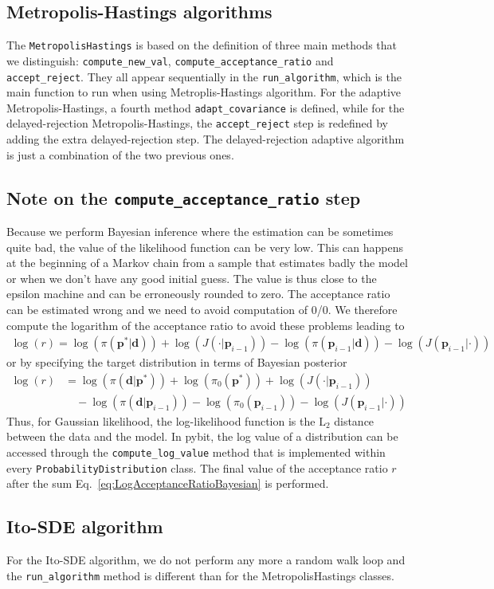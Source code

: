 \documentclass[a4paper,11pt]{article}
\begin{document}
\subsection{Metropolis-Hastings algorithms}

The \texttt{MetropolisHastings} is based on the definition of three main methods that we distinguish: \texttt{compute\_new\_val},  \texttt{compute\_acceptance\_ratio} and \texttt{accept\_reject}. They all appear sequentially in the \texttt{run\_algorithm}, which is the main function to run when using Metroplis-Hastings algorithm. For the adaptive Metropolis-Hastings, a fourth method \texttt{adapt\_covariance} is defined, while for the delayed-rejection Metropolis-Hastings, the \texttt{accept\_reject} step is redefined by adding the extra delayed-rejection step. The delayed-rejection adaptive algorithm is just a combination of the two previous ones. 

\subsection{Note on the \texttt{compute\_acceptance\_ratio} step}

Because we perform Bayesian inference where the estimation can be sometimes quite bad, the value of the likelihood function can be very low. This can happens at the beginning of a Markov chain from a sample that estimates badly the model or when we don't have any good initial guess. The value is thus close to the epsilon machine and can be erroneously rounded to zero. The acceptance ratio can be estimated wrong and we need to avoid computation of 0/0. We therefore compute the logarithm of the acceptance ratio to avoid these problems leading to 
\begin{align}
\log(r) = \log(\pi(\mathbf{p}^* | \mathbf{d})) + \log(J(\cdot | \mathbf{p}_{i-1})) - \log(\pi(\mathbf{p}_{i-1} | \mathbf{d}) ) - \log(J(\mathbf{p}_{i-1} | \cdot) ) 
\label{eq:LogAcceptanceRatio}
\end{align}
or by specifying the target distribution in terms of Bayesian posterior 
\begin{align}
\log(r) &= \log(\pi (\mathbf{d} | \mathbf{p}^*)) + \log (\pi_0(\mathbf{p}^*)) + \log(J(\cdot | \mathbf{p}_{i-1})) \nonumber \\ 
& \quad - \log(\pi(\mathbf{d} | \mathbf{p}_{i-1}))  - \log(\pi_0(\mathbf{p}_{i-1})) - \log(J(\mathbf{p}_{i-1} | \cdot) ) 
\label{eq:LogAcceptanceRatioBayesian}
\end{align}
Thus, for Gaussian likelihood, the log-likelihood function is the $\text{L}_2$ distance between the data and the model. In pybit, the log value of a distribution can be accessed through the \texttt{compute\_log\_value} method that is implemented within every \texttt{ProbabilityDistribution} class. The final value of the acceptance ratio $r$ after the sum Eq.~\ref{eq:LogAcceptanceRatioBayesian} is performed.

\subsection{Ito-SDE algorithm}

For the Ito-SDE algorithm, we do not perform any more a random walk loop and the \texttt{run\_algorithm} method is different than for the MetropolisHastings classes. 
\end{document}
